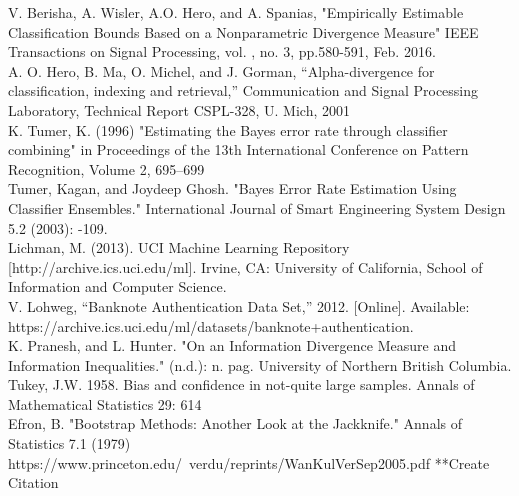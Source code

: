 \documentclass{article}
\begin{document}
	\noindent[2] V. Berisha, A. Wisler, A.O. Hero, and A. Spanias, "Empirically Estimable Classification Bounds 
	\indent Based on a Nonparametric Divergence Measure" IEEE Transactions on Signal Processing, vol. 
	, no. 3, pp.580-591, Feb. 2016.
	\\ [0.5ex]
	
	\noindent[3] A. O. Hero, B. Ma, O. Michel, and J. Gorman, “Alpha-divergence for classification, indexing 
	\indent and retrieval,” Communication and Signal Processing Laboratory, Technical Report CSPL-328, 
	\indent U. Mich, 2001
	\\ [0.5ex]
	
	\noindent [4] K. Tumer, K. (1996) "Estimating the Bayes error rate through classifier combining" in Proceedings 
	\indent of the 13th International Conference on Pattern Recognition, Volume 2, 695–699
	\\ [0.5ex]
	
	\noindent[5] Tumer, Kagan, and Joydeep Ghosh. "Bayes Error Rate Estimation Using Classifier Ensembles." 
	\indent International Journal of Smart Engineering System Design 5.2 (2003): -109.
	\\ [0.5ex]
	
	\noindent[6] Lichman, M. (2013). UCI Machine Learning Repository [http://archive.ics.uci.edu/ml]. Irvine, 
	\indent CA: University of California, School of Information and Computer Science.
	\\ [0.5ex]
	
	\noindent [7] V. Lohweg, “Banknote Authentication Data Set,” 2012. [Online]. Available: https://archive.ics.uci.edu/ml/datasets/banknote+authentication.
	\\ [0.5ex]
	
	\noindent [8] K. Pranesh, and L. Hunter. "On an Information Divergence Measure and Information Inequalities." (n.d.): n. pag. University of Northern British Columbia. 
	\\ [0.5ex]
	
	\noindent [9] Tukey, J.W. 1958. Bias and confidence in not-quite large samples. Annals of Mathematical 
	\indent Statistics 29: 614
	\\ [0.5ex]
	
	\noindent [10] Efron, B. "Bootstrap Methods: Another Look at the Jackknife." Annals of Statistics 7.1 (1979)
	\\ [0.5ex]
	
	\noindent [11] https://www.princeton.edu/~verdu/reprints/WanKulVerSep2005.pdf **Create Citation
	\\ [0.5ex]
	
\end{document}
